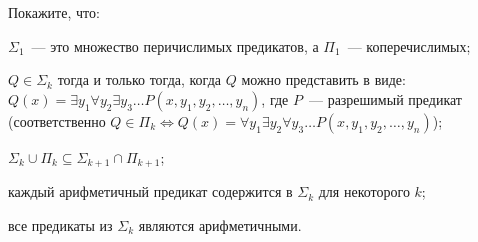 Покажите, что:
\begin{enumcyr}
    \item $\Sigma_1$~--- это множество перичислимых предикатов, а $\Pi_1$~--- коперечислимых;
    \item $Q \in \Sigma_k$ тогда и только тогда, когда $Q$ можно представить в виде: $Q(x) = \exists y_1 \forall y_2
    	\exists y_3 \dots P(x, y_1, y_2, \dots, y_n)$, где $P$~--- разрешимый предикат (соответственно $Q \in \Pi_k
	    \Leftrightarrow Q(x) = \forall y_1 \exists y_2 \forall y_3 \dots P(x, y_1, y_2, \dots, y_n)$);
    \item $\Sigma_k \cup \Pi_k \subseteq \Sigma_{k + 1} \cap \Pi_{k + 1}$;
    \item каждый арифметичный предикат содержится в $\Sigma_k$ для некоторого $k$;
    \item все предикаты из $\Sigma_k$ являются арифметичными.
\end{enumcyr}